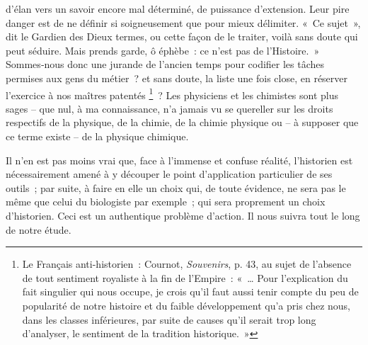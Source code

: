 \documentclass[french,twoside]{book} %
\begin{document}
\label{p2} d’élan vers un savoir encore mal déterminé, de puissance d’extension. Leur pire danger est de ne définir si soigneusement que pour mieux déli­miter. « Ce sujet », dit le Gardien des Dieux termes, ou cette façon de le traiter, voilà sans doute qui peut séduire. Mais prends garde, ô éphèbe : ce n’est pas de l’Histoire. » Sommes‑nous donc une jurande de l’ancien temps pour codifier les tâches permises aux gens du métier ? et sans doute, la liste une fois close, en réserver l’exercice à nos maîtres patentés \footnote{Le Français anti-historien : Cournot, \emph{Souvenirs}, p. 43, au sujet de l’absence de tout sentiment royaliste à la fin de l’Empire : « … Pour l’explication du fait singulier qui nous occupe, je crois qu’il faut aussi tenir compte du peu de popu­larité de notre histoire et du faible développement qu’a pris chez nous, dans les classes inférieures, par suite de causes qu’il serait trop long d’analyser, le sen­timent de la tradition historique. »} ? Les physiciens et les chimistes sont plus sages – que nul, à ma connais­sance, n’a jamais vu se quereller sur les droits respectifs de la physique, de la chimie, de la chimie physique ou – à supposer que ce terme existe – de la physique chimique.\par
Il n’en est pas moins vrai que, face à l’immense et confuse réalité, l’historien est nécessairement amené à y découper le point d’application particulier de ses outils ; par suite, à faire en elle un choix qui, de toute évidence, ne sera pas le même que celui du biologiste par exemple ; qui sera proprement un choix d’historien. Ceci est un authentique pro­blème d’action. Il nous suivra tout le long de notre étude.
\end{document}

